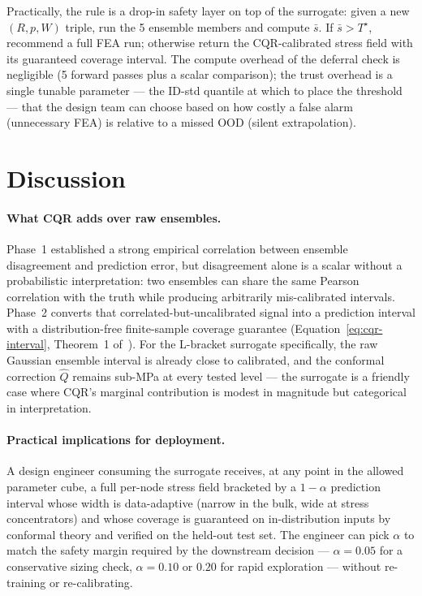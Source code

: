 \documentclass[11pt]{article}
\begin{document}
Practically, the rule is a drop-in safety layer on top of the surrogate:
given a new $(R, p, W)$ triple, run the 5 ensemble members and compute
$\bar{s}$. If $\bar{s} > T^\star$, recommend a full FEA run; otherwise
return the CQR-calibrated stress field with its guaranteed coverage
interval. The compute overhead of the deferral check is negligible (5
forward passes plus a scalar comparison); the trust overhead is a single
tunable parameter --- the ID-std quantile at which to place the
threshold --- that the design team can choose based on how costly a false
alarm (unnecessary FEA) is relative to a missed OOD (silent
extrapolation).

\section{Discussion}
\label{sec:discussion}

\paragraph{What CQR adds over raw ensembles.}
Phase~1 established a strong empirical correlation between ensemble
disagreement and prediction error, but disagreement alone is a scalar
without a probabilistic interpretation: two ensembles can share the same
Pearson correlation with the truth while producing arbitrarily
mis-calibrated intervals. Phase~2 converts that correlated-but-uncalibrated
signal into a prediction interval with a distribution-free finite-sample
coverage guarantee (Equation~\ref{eq:cqr-interval}, Theorem~1
of~\cite{romano2019cqr}). For the L-bracket surrogate specifically, the
raw Gaussian ensemble interval is already close to calibrated, and the
conformal correction $\hat{Q}$ remains sub-MPa at every tested level ---
the surrogate is a friendly case where CQR's marginal contribution is
modest in magnitude but categorical in interpretation.

\paragraph{Practical implications for deployment.}
A design engineer consuming the surrogate receives, at any point in the
allowed parameter cube, a full per-node stress field bracketed by a
$1-\alpha$ prediction interval whose width is data-adaptive (narrow in
the bulk, wide at stress concentrators) and whose coverage is guaranteed
on in-distribution inputs by conformal theory and verified on the
held-out test set. The engineer can pick $\alpha$ to match the safety
margin required by the downstream decision --- $\alpha = 0.05$ for a
conservative sizing check, $\alpha = 0.10$ or $0.20$ for rapid
exploration --- without re-training or re-calibrating.
\end{document}
